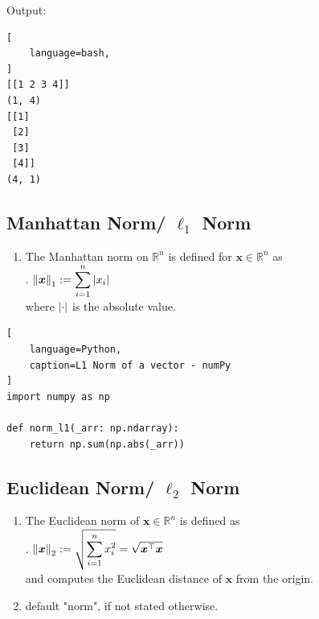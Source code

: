 Output:
\begin{lstlisting}[
    language=bash,
]
[[1 2 3 4]]
(1, 4)
[[1]
 [2]
 [3]
 [4]]
(4, 1)
\end{lstlisting}


\subsection{Manhattan Norm/ $\ell_1$ Norm}

\begin{enumerate}
    \item The Manhattan norm on $\mathbb{R}^n$ is defined for $\bm{x} \in \mathbb{R}^n$ as
    \hfill \cite{mfml/book/mml/Deisenroth-Faisal-Ong}
    \\
    .\hfill
    $
        \left\| \bm{x} \right\|_1 := \displaystyle\sum^n_{i=1} \left| x_i \right|
    $
    \hfill \cite{mfml/book/mml/Deisenroth-Faisal-Ong}
    \\
    where $\left| \cdot \right|$ is the absolute value.
    \hfill \cite{mfml/book/mml/Deisenroth-Faisal-Ong}
\end{enumerate}


\begin{lstlisting}[
    language=Python,
    caption=L1 Norm of a vector - numPy
]
import numpy as np

def norm_l1(_arr: np.ndarray):
    return np.sum(np.abs(_arr))
\end{lstlisting}


\subsection{Euclidean Norm/ $\ell_2$ Norm}

\begin{enumerate}
    \item The Euclidean norm of $\bm{x} \in \mathbb{R}^n$ is defined as
    \hfill \cite{mfml/book/mml/Deisenroth-Faisal-Ong}
    \\
    .\hfill
    $
        \left\| \bm{x} \right\|_2 := \sqrt{ \displaystyle\sum^n_{i=1} x_i^2 } = \sqrt{\bm{x}^\top\bm{x}}
    $
    \hfill \cite{mfml/book/mml/Deisenroth-Faisal-Ong}
    \\
    and computes the Euclidean distance of $\bm{x}$ from the origin.
    \hfill \cite{mfml/book/mml/Deisenroth-Faisal-Ong}

    \item default "norm", if not stated otherwise.
    \hfill \cite{mfml/book/mml/Deisenroth-Faisal-Ong}
\end{enumerate}


